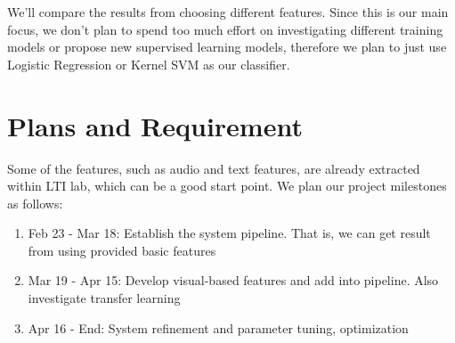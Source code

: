 \documentclass[a4page]{article}
\begin{document}
We'll compare the results from choosing different features. Since this is our main focus, we don't plan to spend too much effort on investigating different training models or propose new supervised learning models, therefore we plan to just use Logistic Regression or Kernel SVM as our classifier. \\


\section{Plans and Requirement}

Some of the features, such as audio and text features, are already extracted within LTI lab, which can be a good start point. We plan our project milestones as follows:

\begin{enumerate}
\item Feb 23 - Mar 18: Establish the system pipeline. That is, we can get result from using provided basic features
\item Mar 19 - Apr 15: Develop visual-based features and add into pipeline. Also investigate transfer learning
\item Apr 16 - End: System refinement and parameter tuning, optimization
\end{enumerate}




\begin{thebibliography}{10}

\end{thebibliography}
\end{document}

